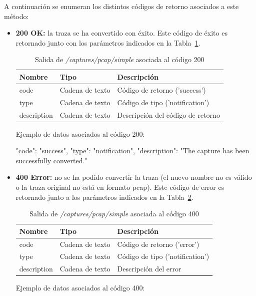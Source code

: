 A continuación se enumeran los distintos códigos de retorno asociados a este método:
\begin{itemize}

\item{\textbf{200 OK:} la \gls{traza} se ha convertido con éxito.
Este código de éxito es retornado junto con los parámetros indicados en la Tabla~\ref{extra:api:capturespcapsimple:ok}.
\begin{table}[H]
\centering
\begin{tabular}{|l|l|l|}
\hline
\rowcolor[HTML]{F5F5F5}
\textbf{Nombre}  & \textbf{Tipo}   & \textbf{Descripción}              \\ \hline
code             & Cadena de texto & Código de retorno ('success')     \\ \hline
type             & Cadena de texto & Código de tipo ('notification')   \\ \hline
description      & Cadena de texto & Descripción del código de retorno \\ \hline
\end{tabular}
\caption{Salida de \textit{/captures/pcap/simple} asociada al código 200}
\label{extra:api:capturespcapsimple:ok}
\end{table}
\begin{minipage}{\textwidth}
Ejemplo de datos asociados al código 200:

\begin{code}[language=json]
{
  "code": "success",
  "type": "notification",
  "description": "The capture has been successfully converted."
}
\end{code}
\end{minipage}
}

\item{\textbf{400 Error:} no se ha podido convertir la \gls{traza} (el nuevo nombre no es válido o la \gls{traza} original no está en formato \gls{pcap}).
Este código de error es retornado junto a los parámetros indicados en la Tabla~\ref{extra:api:capturespcapsimple:error}.
\begin{table}[H]
\centering
\begin{tabular}{|l|l|l|}
\hline
\rowcolor[HTML]{F5F5F5}
\textbf{Nombre}  & \textbf{Tipo}   & \textbf{Descripción}            \\ \hline
code             & Cadena de texto & Código de retorno ('error')     \\ \hline
type             & Cadena de texto & Código de tipo ('notification') \\ \hline
description      & Cadena de texto & Descripción del error           \\ \hline
\end{tabular}
\caption{Salida de \textit{/captures/pcap/simple} asociada al código 400}
\label{extra:api:capturespcapsimple:error}
\end{table}
\begin{minipage}{\textwidth}
Ejemplo de datos asociados al código 400:


\end{minipage}}
\end{itemize}
